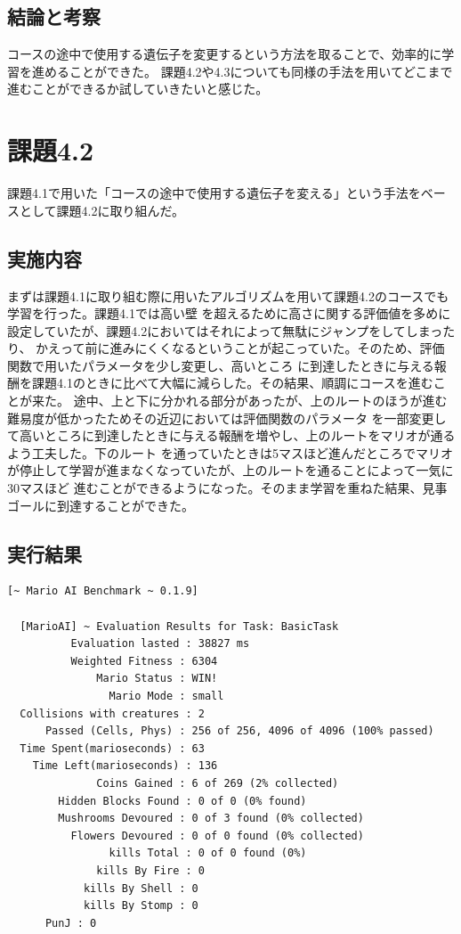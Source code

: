 \documentclass[a4paper,11pt]{jsarticle}
\begin{document}
{\subsection*{結論と考察}
コースの途中で使用する遺伝子を変更するという方法を取ることで、効率的に学習を進めることができた。
課題4.2や4.3についても同様の手法を用いてどこまで進むことができるか試していきたいと感じた。

\section*{課題4.2}

課題4.1で用いた「コースの途中で使用する遺伝子を変える」という手法をベースとして課題4.2に取り組んだ。

\subsection*{実施内容}

まずは課題4.1に取り組む際に用いたアルゴリズムを用いて課題4.2のコースでも学習を行った。課題4.1では高い壁
を超えるために高さに関する評価値を多めに設定していたが、課題4.2においてはそれによって無駄にジャンプをしてしまったり、
かえって前に進みにくくなるということが起こっていた。そのため、評価関数で用いたパラメータを少し変更し、高いところ
に到達したときに与える報酬を課題4.1のときに比べて大幅に減らした。その結果、順調にコースを進むことが来た。
途中、上と下に分かれる部分があったが、上のルートのほうが進む難易度が低かったためその近辺においては評価関数のパラメータ
を一部変更して高いところに到達したときに与える報酬を増やし、上のルートをマリオが通るよう工夫した。下のルート
を通っていたときは5マスほど進んだところでマリオが停止して学習が進まなくなっていたが、上のルートを通ることによって一気に30マスほど
進むことができるようになった。そのまま学習を重ねた結果、見事ゴールに到達することができた。

\subsection*{実行結果}

\begin{lstlisting}[caption=実行結果]
  [~ Mario AI Benchmark ~ 0.1.9]

  [MarioAI] ~ Evaluation Results for Task: BasicTask
          Evaluation lasted : 38827 ms
          Weighted Fitness : 6304
              Mario Status : WIN!
                Mario Mode : small
  Collisions with creatures : 2
      Passed (Cells, Phys) : 256 of 256, 4096 of 4096 (100% passed)
  Time Spent(marioseconds) : 63
    Time Left(marioseconds) : 136
              Coins Gained : 6 of 269 (2% collected)
        Hidden Blocks Found : 0 of 0 (0% found)
        Mushrooms Devoured : 0 of 3 found (0% collected)
          Flowers Devoured : 0 of 0 found (0% collected)
                kills Total : 0 of 0 found (0%)
              kills By Fire : 0
            kills By Shell : 0
            kills By Stomp : 0
      PunJ : 0


\end{lstlisting}}
\end{document}
